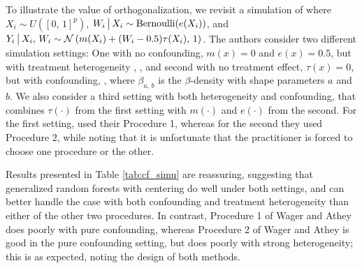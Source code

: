 \documentclass[aos]{imsart}
\theoremstyle{plain}
\theoremstyle{definition}
\theoremstyle{remark}
\begin{document}
\begin{CJK}{UTF8}{gbsn}
To illustrate the value of orthogonalization, we revisit a simulation of
\citet{wager2015estimation} where $X_i \sim U([0, \, 1]^p)$,
$W_i \,\big|\, X_i \sim \text{Bernoulli}(e(X_i))$, and
$Y_i \,\big|\, X_i, \, W_i \sim \mathcal{N}\left(m(X_i) + (W_i - 0.5) \tau(X_i), \, 1\right)$. The authors
consider two different simulation settings: One with no confounding,
$m(x) = 0$ and $e(x) = 0.5$, but with treatment heterogeneity
, ,
and second with no treatment effect, $\tau(x) = 0$, but with confounding,
,
where $\beta_{a, \, b}$ is the $\beta$-density with shape parameters $a$ and $b$.
We also consider a third setting with both heterogeneity and confounding, that combines
$\tau(\cdot)$ from the first setting with $m(\cdot)$ and $e(\cdot)$ from the second.
For the first setting, \citet{wager2015estimation} used their Procedure 1, whereas for the
second they used Procedure 2, while noting that it is unfortunate that the practitioner
is forced to choose one procedure or the other.

Results presented in Table \ref{tab:cf_simu} are reassuring, suggesting that
generalized random forests with centering do well under both settings, and
can better handle the case with both confounding and treatment heterogeneity than
either of the other two procedures. In contrast, Procedure 1 of Wager and Athey
does poorly with pure confounding, whereas Procedure 2 of Wager and Athey
is good in the pure confounding setting, but does poorly with strong heterogeneity;
this is as expected, noting the design of both methods.



\end{CJK}
\end{document}
